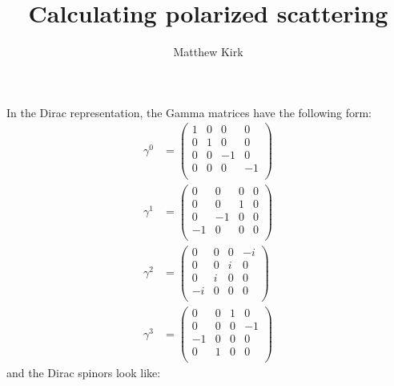 \documentclass[a4paper,11pt]{article}
\author{Matthew Kirk}
\title{Calculating polarized scattering}
\numberwithin{equation}{section} %
\begin{document}
\maketitle



In the Dirac representation, the Gamma matrices have the following form:
\begin{align}
\gamma^0 &= \begin{pmatrix}
 1 & 0 & 0 & 0 \\
 0 & 1 & 0 & 0 \\
 0 & 0 & -1 & 0 \\
 0 & 0 & 0 & -1 \\
\end{pmatrix}
\\
\gamma^1 &= \begin{pmatrix}
 0 & 0 & 0 & 0 \\
 0 & 0 & 1 & 0 \\
 0 & -1 & 0 & 0 \\
 -1 & 0 & 0 & 0 \\
\end{pmatrix}
\\
\gamma^2 &= \begin{pmatrix}
 0 & 0 & 0 & -i \\
 0 & 0 & i & 0 \\
 0 & i & 0 & 0 \\
 -i & 0 & 0 & 0 \\
\end{pmatrix}
\\
\gamma^3 &= \begin{pmatrix}
 0 & 0 & 1 & 0 \\
 0 & 0 & 0 & -1 \\
 -1 & 0 & 0 & 0 \\
 0 & 1 & 0 & 0 \\
\end{pmatrix}
\end{align}
and the Dirac spinors look like:
\end{document}
